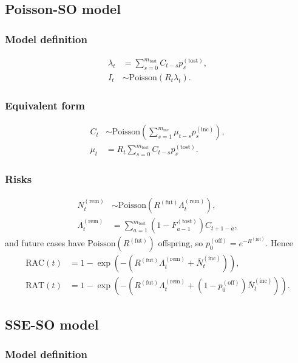 \documentclass{article}
\newcommand{\PoissonDist}[1]{\mathrm{Poisson}\left(#1\right)}
\newcommand{\incPMF}{p^{(\mathrm{inc})}}
\newcommand{\tostPMF}{p^{(\mathrm{tost})}}
\newcommand{\offPMF}{p^{(\mathrm{off})}}
\newcommand{\tostCDF}{F^{(\mathrm{tost})}}
\newcommand{\Rfut}{R^{(\mathrm{fut})}}
\newcommand{\RAC}{\mathrm{RAC}}
\newcommand{\RAT}{\mathrm{RAT}}
\begin{document}
\subsection{Poisson-SO model}
\subsubsection{Model definition}

\begin{align}
  \lambda_{t} &= \sum_{s=0}^{m_{\mathrm{tost}}} C_{t-s} \tostPMF_{s},\\
  I_t &\sim \PoissonDist{R_{t}\lambda_{t}}.
\end{align}

\subsubsection{Equivalent form}

\begin{align}
  C_t &\sim \PoissonDist{\sum_{s=1}^{m_{\mathrm{inc}}}
  \mu_{t-s} \incPMF_{s}},\\
  \mu_t &= R_{t}\sum_{s=0}^{m_{\mathrm{tost}}}
  C_{t-s} \tostPMF_{s}.
\end{align}

\subsubsection{Risks}

\begin{align}
  N^{(\mathrm{rem})}_{t} &\sim
  \PoissonDist{\Rfut\Lambda^{(\mathrm{rem})}_{t}},\\
  \Lambda^{(\mathrm{rem})}_{t}&=\sum_{a=1}^{m_{\mathrm{tost}}}
  (1-\tostCDF_{a-1})C_{t+1-a},
\end{align}
and future cases have \(\PoissonDist{\Rfut}\) offspring, so
\(\offPMF_0=e^{-\Rfut}\). Hence
\begin{align}
  \RAC(t)&=1-\exp\left(-\left(\Rfut\Lambda^{(\mathrm{rem})}_{t}+\bar
  N_t^{(\mathrm{inc})}\right)\right),\\
  \RAT(t)&=1-\exp\left(-\left(\Rfut\Lambda^{(\mathrm{rem})}_{t}+\left(1-\offPMF_0\right)\bar
  N_t^{(\mathrm{inc})}\right)\right).
\end{align}

\subsection{SSE-SO model}
\subsubsection{Model definition}
\end{document}
